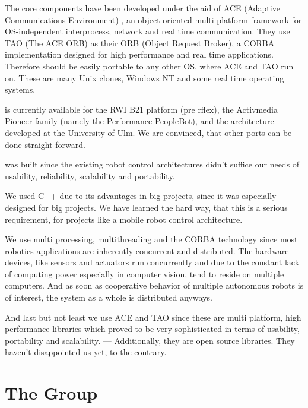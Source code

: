 \documentclass[10pt]{book}
\begin{document}
The \miro core components have been developed under the aid of ACE
(Adaptive Communications Environment) \cite{ACE-Paper, ACE-Manual}, an
object oriented multi-platform framework for OS-independent
interprocess, network and real time communication. They use TAO (The
ACE ORB) \cite{TAO-paper} as their ORB (Object Request Broker), a
CORBA implementation designed for high performance and real time
applications. Therefore \miro should be easily portable to any other
OS, where ACE and TAO run on.  These are many Unix clones, Windows NT
and some real time operating systems.

\miro is currently available for the RWI B21 platform (pre rflex), the
Activmedia Pioneer family (namely the Performance PeopleBot), and the
\sparrow architecture developed at the University of Ulm.  We are
convinced, that other ports can be done straight forward.

\miro was built since the existing robot control architectures didn't
suffice our needs of usability, reliability, scalability and
portability.

We used C++ due to its advantages in big projects, since it was
especially designed for big projects. We have learned the hard way,
that this is a serious requirement, for projects like a mobile robot
control architecture.

We use multi processing, multithreading and the CORBA technology since
most robotics applications are inherently concurrent and distributed.
The hardware devices, like sensors and actuators run concurrently and
due to the constant lack of computing power especially in computer
vision, tend to reside on multiple computers. And as soon as
cooperative behavior of multiple autonomous robots is of interest, the
system as a whole is distributed anyways.


And last but not least we use ACE and TAO since these are multi
platform, high performance libraries which proved to be very
sophisticated in terms of usability, portability and scalability. ---
Additionally, they are open source libraries. They haven't
disappointed us yet, to the contrary.

\section{The \miro Group}
\end{document}
